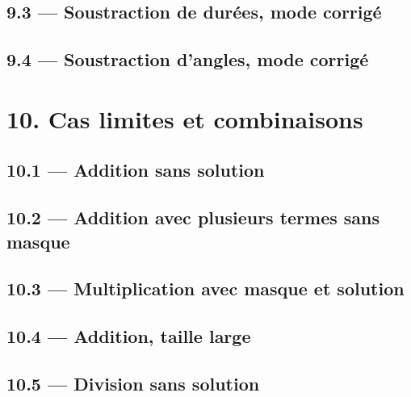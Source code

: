 \documentclass[12pt]{extarticle}
\begin{document}
\subsection*{9.3 — Soustraction de durées, mode corrigé}

\subsection*{9.4 — Soustraction d'angles, mode corrigé}

\section*{10. Cas limites et combinaisons}

\subsection*{10.1 — Addition sans solution}


\subsection*{10.2 — Addition avec plusieurs termes sans masque}


\subsection*{10.3 — Multiplication avec masque et solution}


\subsection*{10.4 — Addition, taille large}


\subsection*{10.5 — Division sans solution}

\division[dividende=1234, diviseur=56]
\end{document}
